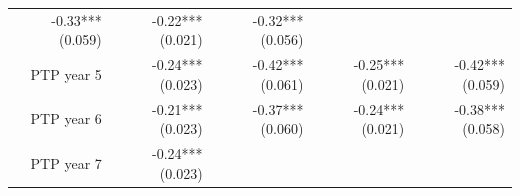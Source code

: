 \documentclass[]{article}
\begin{document}
\begin{longtable}[c]{@{}rrrrr@{}}
\begin{minipage}[t]{0.16\columnwidth}
-0.33*** (0.059)
\strut\end{minipage} &
\begin{minipage}[t]{0.21\columnwidth}\raggedleft\strut
-0.22*** (0.021)
\strut\end{minipage} &
\begin{minipage}[t]{0.15\columnwidth}\raggedleft\strut
-0.32*** (0.056)
\strut\end{minipage}\tabularnewline
\begin{minipage}[t]{0.17\columnwidth}\raggedleft\strut
PTP year 5
\strut\end{minipage} &
\begin{minipage}[t]{0.18\columnwidth}\raggedleft\strut
-0.24*** (0.023)
\strut\end{minipage} &
\begin{minipage}[t]{0.16\columnwidth}\raggedleft\strut
-0.42*** (0.061)
\strut\end{minipage} &
\begin{minipage}[t]{0.21\columnwidth}\raggedleft\strut
-0.25*** (0.021)
\strut\end{minipage} &
\begin{minipage}[t]{0.15\columnwidth}\raggedleft\strut
-0.42*** (0.059)
\strut\end{minipage}\tabularnewline
\begin{minipage}[t]{0.17\columnwidth}\raggedleft\strut
PTP year 6
\strut\end{minipage} &
\begin{minipage}[t]{0.18\columnwidth}\raggedleft\strut
-0.21*** (0.023)
\strut\end{minipage} &
\begin{minipage}[t]{0.16\columnwidth}\raggedleft\strut
-0.37*** (0.060)
\strut\end{minipage} &
\begin{minipage}[t]{0.21\columnwidth}\raggedleft\strut
-0.24*** (0.021)
\strut\end{minipage} &
\begin{minipage}[t]{0.15\columnwidth}\raggedleft\strut
-0.38*** (0.058)
\strut\end{minipage}\tabularnewline
\begin{minipage}[t]{0.17\columnwidth}\raggedleft\strut
PTP year 7
\strut\end{minipage} &
\begin{minipage}[t]{0.18\columnwidth}\raggedleft\strut
-0.24*** (0.023)
\strut\end{minipage} &
\begin{minipage}[t]{0.16\columnwidth}\raggedleft\strut

\end{minipage}
\end{longtable}
\end{document}
